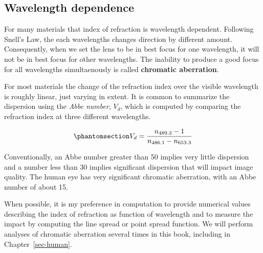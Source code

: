 \documentclass[
  letterpaper,
]{book}
\begin{document}
\subsection{Wavelength dependence}\label{sec-chromatic-aberration}

For many materials that index of refraction is wavelength dependent.
Following Snell's Law, the each wavelengths changes direction by
different amount. Consequently, when we set the lens to be in best focus
for one wavelength, it will not be in best focus for other wavelengths.
The inability to produce a good focus for all wavelengths simultaenously
is called \textbf{chromatic aberration}.

For most materials the change of the refraction index over the visible
wavelength is roughly linear, just varying in extent. It is common to
summarize the dispersion using the \emph{Abbe number}, \(V_d\), which is
computed by comparing the refraction index at three different
wavelengths.

\begin{equation}\phantomsection\label{eq-abbe}{ 
V_d = \frac{n_{489.3} - 1}{n_{486.1} - n_{653.3}}
}\end{equation}

Conventionally, an Abbe number greater than 50 implies very little
dispersion and a number less than 30 implies significant dispersion that
will impact image quality. The human eye has very significant chromatic
aberration, with an Abbe number of about 15.

When possible, it is my preference in computation to provide numerical
values describing the index of refraction as function of wavelength and
to measure the impact by computing the line spread or point spread
function. We will perform analyses of chromatic aberration several times
in this book, including in Chapter~\ref{sec-human}.
\end{document}
